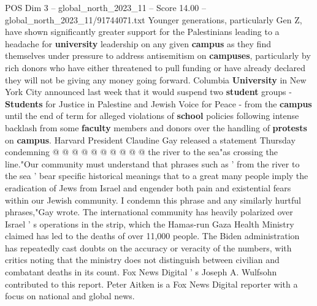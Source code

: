 \begin{textsample}{POS Dim 3 – global\_north\_2023\_11 – Score 14.00 – global\_north\_2023\_11/91744071.txt}
Younger generations, particularly Gen Z, have shown significantly greater support for the Palestinians leading to a headache for \textbf{university} leadership on any given \textbf{campus} as they find themselves under pressure to address antisemitism on \textbf{campuses}, particularly by rich donors who have either threatened to pull funding or have already declared they will not be giving any money going forward.
Columbia \textbf{University} in New York City announced last week that it would suspend two \textbf{student} groups - \textbf{Students} for Justice in Palestine and Jewish Voice for Peace - from the \textbf{campus} until the end of term for alleged violations of \textbf{school} policies following intense backlash from some \textbf{faculty} members and donors over the handling of \textbf{protests} on \textbf{campus}.
Harvard President Claudine Gay released a statement Thursday condemning @ @ @ @ @ @ @ @ @ @ the river to the sea"as crossing the line."Our community must understand that phrases such as ' from the river to the sea ' bear specific historical meanings that to a great many people imply the eradication of Jews from Israel and engender both pain and existential fears within our Jewish community.
I condemn this phrase and any similarly hurtful phrases,"Gay wrote.
The international community has heavily polarized over Israel ' s operations in the strip, which the Hamas-run Gaza Health Ministry claimed has led to the deaths of over 11,000 people.
The Biden administration has repeatedly cast doubts on the accuracy or veracity of the numbers, with critics noting that the ministry does not distinguish between civilian and combatant deaths in its count.
Fox News Digital ' s Joseph A.
Wulfsohn contributed to this report.
Peter Aitken is a Fox News Digital reporter with a focus on national and global news.

\end{textsample}

